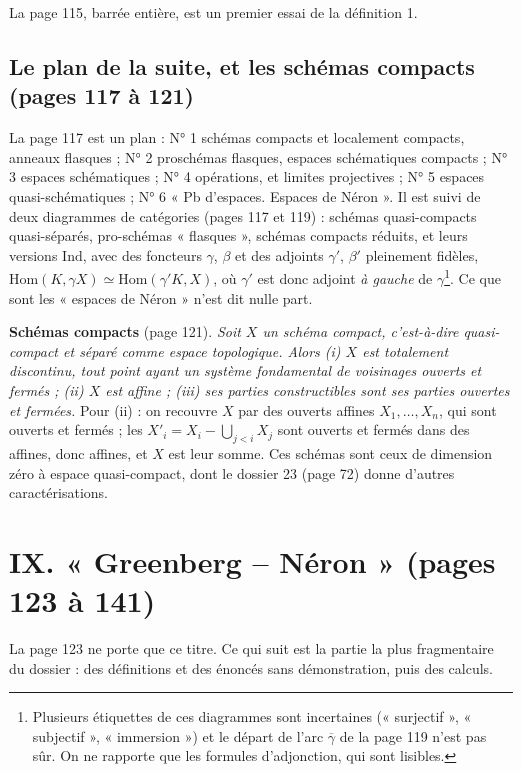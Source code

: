 \documentclass[11pt,a4paper]{article}
\begin{document}
La page 115, barrée entière, est un premier essai de la définition 1.

\subsection*{Le plan de la suite, et les schémas compacts (pages 117 à 121)}

La page 117 est un plan : N° 1 schémas compacts et localement compacts,
anneaux flasques ; N° 2 proschémas flasques, espaces schématiques compacts ;
N° 3 espaces schématiques ; N° 4 opérations, et limites projectives ; N° 5
espaces quasi-schématiques ; N° 6 « Pb d'espaces. Espaces de Néron ». Il est
suivi de deux diagrammes de catégories (pages 117 et 119) : schémas
quasi-compacts quasi-séparés, pro-schémas « flasques », schémas compacts
réduits, et leurs versions $\mathrm{Ind}$, avec des foncteurs $\gamma$, $\beta$ et
des adjoints $\gamma'$, $\beta'$ pleinement fidèles, $\mathrm{Hom}(K, \gamma X)
\simeq \mathrm{Hom}(\gamma' K, X)$, où $\gamma'$ est donc adjoint \emph{à gauche}
de $\gamma$\footnote{Plusieurs étiquettes de ces diagrammes sont incertaines
(« surjectif », « subjectif », « immersion ») et le départ de l'arc
$\overline{\gamma}$ de la page 119 n'est pas sûr. On ne rapporte que les
formules d'adjonction, qui sont lisibles.}. Ce que sont les « espaces de
Néron » n'est dit nulle part.

\textbf{Schémas compacts} (page 121). \emph{Soit $X$ un schéma compact, c'est-à-dire
quasi-compact et séparé comme espace topologique. Alors (i) $X$ est totalement
discontinu, tout point ayant un système fondamental de voisinages ouverts et
fermés ; (ii) $X$ est affine ; (iii) ses parties constructibles sont ses parties
ouvertes et fermées.} Pour (ii) : on recouvre $X$ par des ouverts affines
$X_1, \ldots, X_n$, qui sont ouverts et fermés ; les $X'_i = X_i - \bigcup_{j<i}
X_j$ sont ouverts et fermés dans des affines, donc affines, et $X$ est leur
somme. Ces schémas sont ceux de dimension zéro à espace quasi-compact, dont le
dossier 23 (page 72) donne d'autres caractérisations.

\section*{IX. « Greenberg -- Néron » (pages 123 à 141)}

La page 123 ne porte que ce titre. Ce qui suit est la partie la plus
fragmentaire du dossier : des définitions et des énoncés sans démonstration,
puis des calculs.
\end{document}
